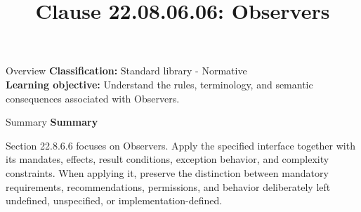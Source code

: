\documentclass[10pt,letterpaper]{article}
\title{Clause 22.08.06.06: Observers}
\author{}
\date{}
\begin{document}
\maketitle
\begin{CornellOverviewBox}{Overview}
\textbf{Classification:} Standard library - Normative\\[2pt]
\textbf{Learning objective:} Understand the rules, terminology, and semantic consequences associated with Observers.
\end{CornellOverviewBox}\begin{CornellSummaryBox}{Summary}
{\sffamily\bfseries\color{Accent} Summary}\par\vspace{3pt}Section 22.8.6.6 focuses on Observers. Apply the specified interface together with its mandates, effects, result conditions, exception behavior, and complexity constraints. When applying it, preserve the distinction between mandatory requirements, recommendations, permissions, and behavior deliberately left undefined, unspecified, or implementation-defined.
\end{CornellSummaryBox}
\end{document}
